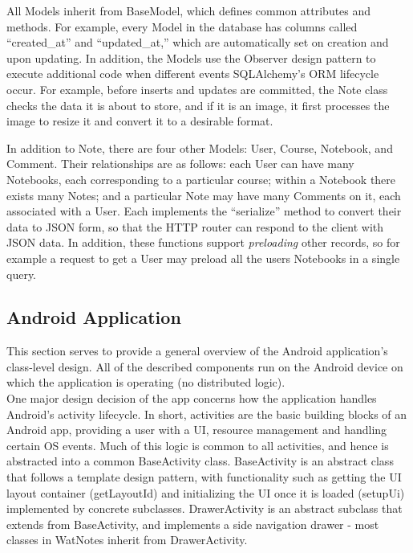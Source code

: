 \documentclass[12pt]{article}
\begin{document}
    All Models inherit from BaseModel, which defines common attributes and
    methods. For example, every Model in the database has columns called
    ``created\_at'' and ``updated\_at,'' which are automatically set on creation
    and upon updating. In addition, the Models use the Observer design pattern
    to execute additional code when different events SQLAlchemy's ORM lifecycle
    occur. For example, before inserts and updates are committed, the Note class
    checks the data it is about to store, and if it is an image, it first
    processes the image to resize it and convert it to a desirable format.

    In addition to Note, there are four other Models: User, Course, Notebook,
    and Comment. Their relationships are as follows: each User can have many
    Notebooks, each corresponding to a particular course; within a Notebook
    there exists many Notes; and a particular Note may have many Comments on it,
    each associated with a User. Each implements the ``serialize'' method to
    convert their data to JSON form, so that the HTTP router can respond to the
    client with JSON data. In addition, these functions support
    \emph{preloading} other records, so for example a request to get a User may
    preload all the users Notebooks in a single query.

  \subsection{Android Application}
    This section serves to provide a general overview of the Android application's class-level design. All of the described components run on the Android
    device on which the application is operating (no distributed logic). \\

    One major design decision of the app concerns how the application handles Android's activity lifecycle. In short, activities are the basic building blocks of
    an Android app, providing a user with a UI, resource management and handling certain OS events. Much of this logic is common to all activities, and
    hence is abstracted into a common BaseActivity class. BaseActivity is an abstract class that follows a template design pattern, with functionality
    such as getting the UI layout container (getLayoutId) and initializing the UI once it is loaded (setupUi) implemented by concrete subclasses. DrawerActivity
    is an abstract subclass that extends from BaseActivity, and implements a side navigation drawer - most classes in WatNotes inherit from DrawerActivity. \\
\end{document}
